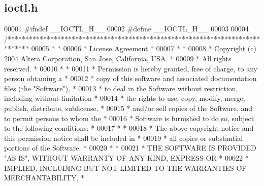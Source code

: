 \subsection{ioctl.\+h}
\label{ioctl_8h_source}

\begin{DoxyCode}
00001 \textcolor{preprocessor}{#ifndef \_\_IOCTL\_H\_\_}
00002 \textcolor{preprocessor}{#define \_\_IOCTL\_H\_\_}
00003 
00004 \textcolor{comment}{/******************************************************************************}
00005 \textcolor{comment}{*                                                                             *}
00006 \textcolor{comment}{* License Agreement                                                           *}
00007 \textcolor{comment}{*                                                                             *}
00008 \textcolor{comment}{* Copyright (c) 2004 Altera Corporation, San Jose, California, USA.           *}
00009 \textcolor{comment}{* All rights reserved.                                                        *}
00010 \textcolor{comment}{*                                                                             *}
00011 \textcolor{comment}{* Permission is hereby granted, free of charge, to any person obtaining a     *}
00012 \textcolor{comment}{* copy of this software and associated documentation files (the "Software"),  *}
00013 \textcolor{comment}{* to deal in the Software without restriction, including without limitation   *}
00014 \textcolor{comment}{* the rights to use, copy, modify, merge, publish, distribute, sublicense,    *}
00015 \textcolor{comment}{* and/or sell copies of the Software, and to permit persons to whom the       *}
00016 \textcolor{comment}{* Software is furnished to do so, subject to the following conditions:        *}
00017 \textcolor{comment}{*                                                                             *}
00018 \textcolor{comment}{* The above copyright notice and this permission notice shall be included in  *}
00019 \textcolor{comment}{* all copies or substantial portions of the Software.                         *}
00020 \textcolor{comment}{*                                                                             *}
00021 \textcolor{comment}{* THE SOFTWARE IS PROVIDED "AS IS", WITHOUT WARRANTY OF ANY KIND, EXPRESS OR  *}
00022 \textcolor{comment}{* IMPLIED, INCLUDING BUT NOT LIMITED TO THE WARRANTIES OF MERCHANTABILITY,    *}

\end{DoxyCode}

